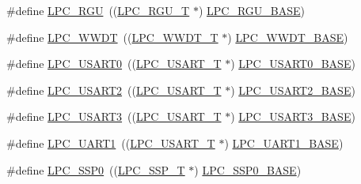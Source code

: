 \begin{DoxyCompactItemize}
\item 
\#define \hyperlink{group___p_e_r_i_p_h__18_x_x___b_a_s_e_gab631e0dff2443a7a1e4fa99c9a6fe88e}{L\+P\+C\+\_\+\+R\+GU}~((\hyperlink{struct_l_p_c___r_g_u___t}{L\+P\+C\+\_\+\+R\+G\+U\+\_\+T}              $\ast$) \hyperlink{group___p_e_r_i_p_h__43_x_x___b_a_s_e_gaff6de015a63620b4c552891c1ac9f756}{L\+P\+C\+\_\+\+R\+G\+U\+\_\+\+B\+A\+SE})
\item 
\#define \hyperlink{group___p_e_r_i_p_h__18_x_x___b_a_s_e_ga235e068b1412366044449dba68194c55}{L\+P\+C\+\_\+\+W\+W\+DT}~((\hyperlink{struct_l_p_c___w_w_d_t___t}{L\+P\+C\+\_\+\+W\+W\+D\+T\+\_\+T}             $\ast$) \hyperlink{group___p_e_r_i_p_h__43_x_x___b_a_s_e_ga9b83c39ba53f9c9e87974984c96e35de}{L\+P\+C\+\_\+\+W\+W\+D\+T\+\_\+\+B\+A\+SE})
\item 
\#define \hyperlink{group___p_e_r_i_p_h__18_x_x___b_a_s_e_ga3255c792adeee40643c8f5c32e852107}{L\+P\+C\+\_\+\+U\+S\+A\+R\+T0}~((\hyperlink{struct_l_p_c___u_s_a_r_t___t}{L\+P\+C\+\_\+\+U\+S\+A\+R\+T\+\_\+T}            $\ast$) \hyperlink{group___p_e_r_i_p_h__43_x_x___b_a_s_e_gaa878cf5cffe359eaf1eba511ab537ba9}{L\+P\+C\+\_\+\+U\+S\+A\+R\+T0\+\_\+\+B\+A\+SE})
\item 
\#define \hyperlink{group___p_e_r_i_p_h__18_x_x___b_a_s_e_gae6539c90608a0da79ee287639201fc6c}{L\+P\+C\+\_\+\+U\+S\+A\+R\+T2}~((\hyperlink{struct_l_p_c___u_s_a_r_t___t}{L\+P\+C\+\_\+\+U\+S\+A\+R\+T\+\_\+T}            $\ast$) \hyperlink{group___p_e_r_i_p_h__43_x_x___b_a_s_e_gac377e7801bf13eb388b8f2cbdc61091f}{L\+P\+C\+\_\+\+U\+S\+A\+R\+T2\+\_\+\+B\+A\+SE})
\item 
\#define \hyperlink{group___p_e_r_i_p_h__18_x_x___b_a_s_e_ga206737c2cfff0f9dcaac507068711310}{L\+P\+C\+\_\+\+U\+S\+A\+R\+T3}~((\hyperlink{struct_l_p_c___u_s_a_r_t___t}{L\+P\+C\+\_\+\+U\+S\+A\+R\+T\+\_\+T}            $\ast$) \hyperlink{group___p_e_r_i_p_h__43_x_x___b_a_s_e_gabe7b830995c08b4b9ecd941f14c2a593}{L\+P\+C\+\_\+\+U\+S\+A\+R\+T3\+\_\+\+B\+A\+SE})
\item 
\#define \hyperlink{group___p_e_r_i_p_h__18_x_x___b_a_s_e_ga83ea0dab4dcb7411c2e1de20050a4d2d}{L\+P\+C\+\_\+\+U\+A\+R\+T1}~((\hyperlink{struct_l_p_c___u_s_a_r_t___t}{L\+P\+C\+\_\+\+U\+S\+A\+R\+T\+\_\+T}            $\ast$) \hyperlink{group___p_e_r_i_p_h__43_x_x___b_a_s_e_ga18e8f96b25e3f343bdd7ba552ae7a617}{L\+P\+C\+\_\+\+U\+A\+R\+T1\+\_\+\+B\+A\+SE})
\item 
\#define \hyperlink{group___p_e_r_i_p_h__18_x_x___b_a_s_e_gac213e0325a8e8a972bd2e0dd6ccf353c}{L\+P\+C\+\_\+\+S\+S\+P0}~((\hyperlink{struct_l_p_c___s_s_p___t}{L\+P\+C\+\_\+\+S\+S\+P\+\_\+T}              $\ast$) \hyperlink{group___p_e_r_i_p_h__43_x_x___b_a_s_e_ga53fb1af80b541545988f2a966681abfd}{L\+P\+C\+\_\+\+S\+S\+P0\+\_\+\+B\+A\+SE})

\end{DoxyCompactItemize}

